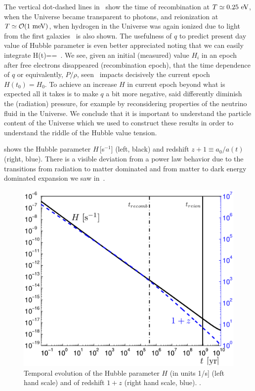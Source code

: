 The vertical dot-dashed lines in~ show the time of recombination at $T\simeq0.25\text{ eV}$, when the Universe became transparent to photons, and reionization at $T\simeq {\cal O}(1\meV)$, when hydrogen in the Universe was again ionized due to light from the first galaxies~\cite{Zaroubi:2012in} is also shown. The usefulness of $q$ to predict present day value of Hubble parameter is even better appreciated noting that we can easily integrate  
\beqn\label{eq:HdotInt}
H(t)==
\,.
\eeqn
We see, given an initial (measured) value $H_i$ in an epoch after free electrons disappeared (recombination epoch), that the time dependence of $q$ or equivalently, $P/\rho$, seen~ impacts decisively the current epoch $H(t_0)=H_0$. To achieve an increase $H$ in current epoch beyond what is expected all it takes is to make $q$ a bit more negative, said differently diminish the (radiation) pressure, for example by reconsidering properties of the neutrino fluid in the Universe. We conclude that it is important to understand the particle content of the Universe which we used to construct these results in order to understand the riddle of the Hubble value tension.

 shows the Hubble parameter $H$\,[s$^{-1}$] (left, black) and redshift $z+1\equiv a_0/a(t)$ (right, blue). There is a visible deviation from a power law behavior due to the transitions from radiation to matter dominated and from matter to dark energy dominated expansion we saw in~. 

\begin{figure}
\centerline{\includegraphics[width=0.88\linewidth]{01-introduction/Figures/Hztoday.png}}
\caption{Temporal evolution of the Hubble parameter $H$ (in units 1/s] (left hand scale) and of redshift $1+z$ (right hand scale, blue). . 
\label{fig:today1} }
\end{figure}


